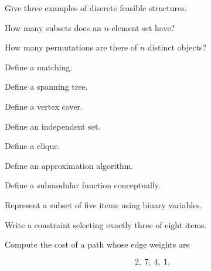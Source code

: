\begin{exercise}[1]
Give three examples of discrete feasible structures.
\end{exercise}

\begin{exercise}[1]
How many subsets does an \(n\)-element set have?
\end{exercise}

\begin{exercise}[1]
How many permutations are there of \(n\) distinct objects?
\end{exercise}

\begin{exercise}[1]
Define a matching.
\end{exercise}

\begin{exercise}[1]
Define a spanning tree.
\end{exercise}

\begin{exercise}[1]
Define a vertex cover.
\end{exercise}

\begin{exercise}[1]
Define an independent set.
\end{exercise}

\begin{exercise}[1]
Define a clique.
\end{exercise}

\begin{exercise}[1]
Define an approximation algorithm.
\end{exercise}

\begin{exercise}[1]
Define a submodular function conceptually.
\end{exercise}

\begin{exercise}[2]
Represent a subset of five items using binary variables.
\end{exercise}

\begin{exercise}[2]
Write a constraint selecting exactly three of eight items.
\end{exercise}

\begin{exercise}[2]
Compute the cost of a path whose edge weights are

\[
2,\ 7,\ 4,\ 1.
\]
\end{exercise}

